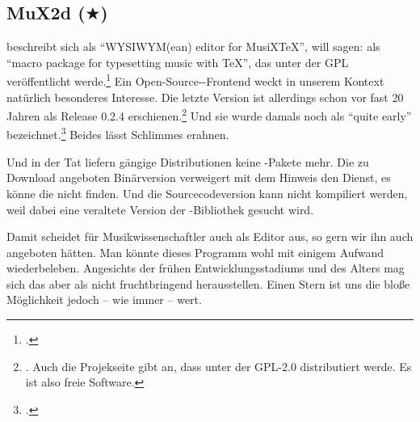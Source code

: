 %
%
%



\subsection{MuX2d ($\bigstar$)}

\label{MuX2d} beschreibt sich als \enquote{WYSIWYM(ean) editor for
MusiXTeX}, will sagen: als \enquote{macro package for typesetting music with
TeX}, das unter der GPL veröffentlicht werde.\footcite[vgl.][\nopage
wp.]{Mux2d2000a} Ein Open-Source--Frontend weckt in unserem
Kontext natürlich besonderes Interesse. Die letzte Version ist allerdings schon
vor fast 20 Jahren als Release 0.2.4 erschienen.\footnote{\cite[vgl.][\nopage
wp.]{Mux2d2000b}. Auch die Projekseite gibt an, dass  unter der GPL-2.0
distributiert werde. Es ist also freie Software.} Und sie wurde damals noch als
\enquote{quite early} bezeichnet.\footcite[vgl.][\nopage wp.]{Mux2d2000a} Beides
lässt Schlimmes erahnen.

Und in der Tat liefern gängige Distributionen keine -Pakete mehr. Die
zu Download angeboten Binärversion verweigert mit dem Hinweis den Dienst, es
könne die  nicht finden. Und die Sourcecodeversion kann nicht
kompiliert werden, weil dabei eine veraltete Version der -Bibliothek
gesucht wird.

Damit scheidet für Musikwissenschaftler auch  als Editor aus, so gern
wir ihn auch angeboten hätten. Man könnte dieses Programm wohl mit einigem
Aufwand wiederbeleben. Angesichts der frühen Entwicklungsstadiums und des Alters
mag sich das aber als nicht fruchtbringend herausstellen. Einen Stern ist uns
die bloße Möglichkeit jedoch -- wie immer -- wert.
%
